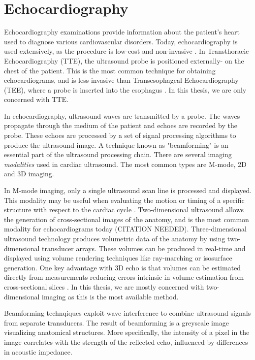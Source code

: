 \documentclass{article}
\begin{document}
\section{Echocardiography}
Echocardiography examinations provide information about the patient's heart used to diagnose various 
cardiovascular disorders. Today, echocardiography is used extensively, as the procedure is low-cost and non-invasive \cite{Omerovic2023}.
In Transthoracic Echocardiography (TTE), the ultrasound probe is positioned externally- on the chest of the patient.
This is the most common technique for obtaining echocardiograms, and is less invasive than Transesophageal Echocardiography (TEE), where 
a probe is inserted into the esophagus \cite{Omerovic2023}. In this thesis, we are only concerned with TTE.

In echocardiography, ultrasound waves are transmitted by a probe. The waves propagate through the medium of the patient and echoes are recorded
by the probe. These echoes are processed by a set of signal processing algorithms to produce the ultrasound image. A technique known as "beamforming" is an essential part of the ultrasound processing chain. 
There are several imaging \textit{modalities} used in cardiac ultrasound. The most common types are M-mode, 2D and 3D imaging.

In M-mode imaging, only a single ultrasound scan line is processed and displayed. This modality
may be useful when evaluating the motion or timing of a specific structure with respect to the cardiac cycle \cite{SAUL2015686}.
Two-dimensional ultrasound allows the generation of cross-sectional images of the anatomy, and is the most common modality for 
echocardiograms today (CITATION NEEDED). Three-dimensional ultrasound technology produces volumetric data of the anatomy by using two-dimensional transducer arrays.
These volumes can be produced in real-time and displayed using volume rendering techniques like ray-marching or isosurface generation. One key advantage with 3D echo
is that volumes can be estimated directly from measurements reducing errors intrinsic in volume estimation from cross-sectional slices \cite{Shah2013}.
In this thesis, we are mostly concerned with two-dimensional imaging as this is the most available method.

Beamforming technqiques exploit wave interference to combine ultrasound signals from separate transducers. The result of beamforming is a
greyscale image visualizing anatomical structures. More specifically, the intensity of a pixel in the image correlates with the strength of the reflected echo, influenced by differences
in acoustic impedance.
\end{document}
